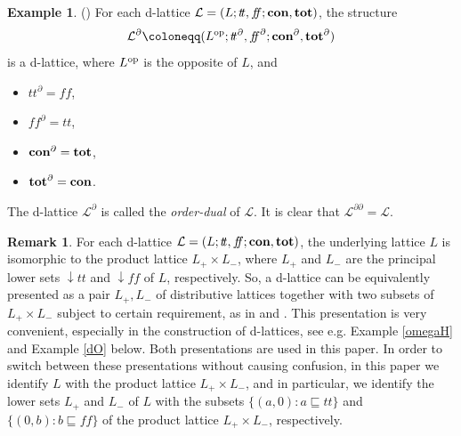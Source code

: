 \documentclass[11pt]{article}
\theoremstyle{plain}
\theoremstyle{definition}
\newtheorem{exmp}[thm]{Example}
\newtheorem{rem}[thm]{Remark}
\newcommand{\dbt}{{t\!t}}
\newcommand{\dbf}{{f\!\!f}}
\begin{document}
\begin{exmp} \label{order dual} (\cite[Definition 2.1.4]{Klinke}) For each  d-lattice $\mathcal{L}=(L;\dbt,\dbf;{\bf con},{\bf tot})$, the structure $$\mathcal{L}^\partial\coloneqq (L^{\rm op};\dbt^\partial,\dbf^\partial; {\bf con}^\partial, {\bf tot}^\partial)$$ is a d-lattice, where $L^{\rm op}$ is the opposite of $L$, and \begin{itemize} \setlength{\itemsep}{0pt}
 \item $\dbt^\partial=\dbf$, \item $\dbf^\partial=\dbt$, \item  ${\bf con}^\partial={\bf tot}$, \item ${\bf tot}^\partial={\bf con}$. \end{itemize} The d-lattice $\mathcal{L}^\partial$ is  called the \emph{order-dual}  of $\mathcal{L}$. It is clear that $\mathcal{L}^{\partial\partial} =\mathcal{L}$. \end{exmp}
  
\begin{rem}For each d-lattice $\mathcal{L}=(L;\dbt,\dbf;{\bf con},{\bf tot})$, the underlying lattice $L$ is isomorphic to the product lattice $L_+\times L_-$, where $L_+$ and $L_-$ are the principal lower sets $\downarrow\!\dbt$ and  $\downarrow\!\dbf$ of $L$, respectively. So, a d-lattice can be equivalently presented as a pair $L_+,L_-$ of distributive lattices together with two subsets of $L_+\times L_-$ subject to certain requirement, as in \cite[Definition 1]{KJM} and \cite[Definition 2.1.2]{Klinke}. This presentation is very convenient, especially in the construction of d-lattices, see e.g. Example \ref{omegaH} and Example \ref{dO} below. Both presentations are used in this paper. In order to switch between these presentations without causing confusion, in this paper we identify $L$ with the product lattice $L_+\times L_-$,  and in particular, we identify the lower sets $L_+$ and $L_-$ of $L$ with the subsets $\{(a,0):a\sqsubseteq\dbt\}$ and $\{(0,b):b\sqsubseteq\dbf\}$ of the product lattice $L_+\times L_-$, respectively. 
\begin{center}\end{center} \end{rem}
\end{document}
